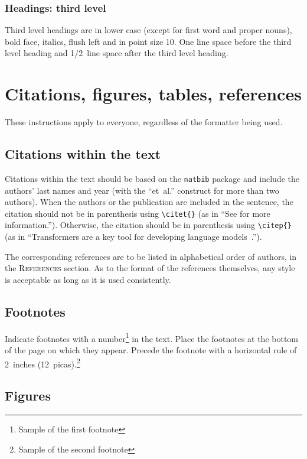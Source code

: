 \documentclass{article} %
\begin{document}
\subsubsection{Headings: third level}

Third level headings are in lower case (except for first word and proper nouns), bold face, italics, 
flush left and in point size 10. One line space before the third level
heading and 1/2~line space after the third level heading.

\section{Citations, figures, tables, references}\label{others}

These instructions apply to everyone, regardless of the formatter being used.

\subsection{Citations within the text}

Citations within the text should be based on the \texttt{natbib} package
and include the authors' last names and year (with the ``et~al.'' construct
for more than two authors). When the authors or the publication are
included in the sentence, the citation should not be in parenthesis using \verb|\citet{}| (as
in ``See \citet{Vaswani+2017} for more information.''). Otherwise, the citation
should be in parenthesis using \verb|\citep{}| (as in ``Transformers are a key tool
for developing language models~\citep{Vaswani+2017}.'').

The corresponding references are to be listed in alphabetical order of
authors, in the \textsc{References} section. As to the format of the
references themselves, any style is acceptable as long as it is used
consistently.

\subsection{Footnotes}

Indicate footnotes with a number\footnote{Sample of the first footnote} in the
text. Place the footnotes at the bottom of the page on which they appear.
Precede the footnote with a horizontal rule of 2~inches
(12~picas).\footnote{Sample of the second footnote}

\subsection{Figures}
\end{document}
